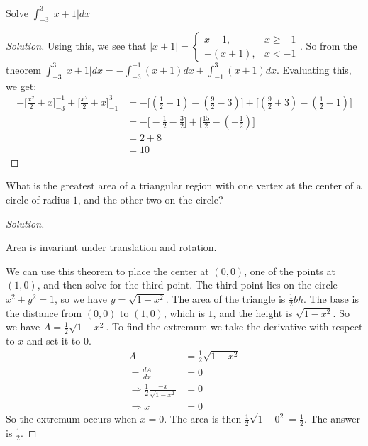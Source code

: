 \documentclass[crop=false,class=book,oneside]{standalone}
\begin{document}
            \begin{problem}
                Solve $\int_{-3}^{3}|x+1|dx$
            \end{problem}
            \begin{proof}[Solution]
                Using this, we see that
                $|x+1|=\begin{cases}%
                    x+1,&x\geq -1\\%
                    -(x+1),&x< -1%
                \end{cases}$.
                So from the theorem
                $\int_{-3}^{3}|x+1|dx=%
                -\int_{-3}^{-1}(x+1)dx+\int_{-1}^{3}(x+1)dx$.
                Evaluating this, we get:
                \begin{align*}
                    -\bigg[\frac{x^2}{2}+x\bigg]_{-3}^{-1}
                    +\bigg[\frac{x^2}{2}+x\bigg]_{-1}^{3}
                    &=-\bigg[(\frac{1}{2}-1)-(\frac{9}{2}-3)\bigg]
                    +\bigg[(\frac{9}{2}+3)-(\frac{1}{2}-1)\bigg]\\
                    &=-\bigg[-\frac{1}{2}-\frac{3}{2}\bigg]
                    +\bigg[\frac{15}{2}-(-\frac{1}{2})\bigg]\\
                    &=2+8\\ 
                    &=10
                \end{align*}
            \end{proof}
            \begin{problem}
            What is the greatest area of a triangular region with one vertex at the center of a circle of radius $1$, and the other two on the circle?
            \end{problem}
            \begin{proof}[Solution]
            \begin{theorem*}
            Area is invariant under translation and rotation.
            \end{theorem*}
            We can use this theorem to place the center at $(0,0)$, one of the points at $(1,0)$, and then solve for the third point. The third point lies on the circle $x^2+y^2 = 1$, so we have $y = \sqrt{1-x^2}$. The area of the triangle is $\frac{1}{2}bh$. The base is the distance from $(0,0)$ to $(1,0)$, which is $1$, and the height is $\sqrt{1-x^2}$. So we have $A = \frac{1}{2}\sqrt{1-x^2}$. To find the extremum we take the derivative with respect to $x$ and set it to $0$.
            \begin{align*}
                A&=\frac{1}{2}\sqrt{1-x^{2}}\\
                =\frac{dA}{dx}&=0\\
                \Rightarrow\frac{1}{2}\frac{-x}{\sqrt{1-x^{2}}}&=0\\
                \Rightarrow x&=0
            \end{align*}
            So the extremum occurs when $x=0$. The area is then $\frac{1}{2}\sqrt{1-0^2} = \frac{1}{2}$. The answer is $\frac{1}{2}$.
            \end{proof}
\end{document}
